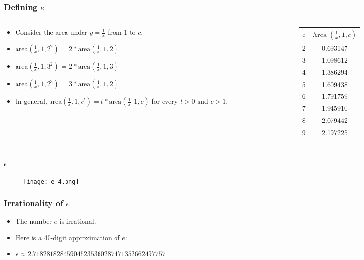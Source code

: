 \begin{frame}
  \frametitle{Defining \(e\)}
  \begin{columns}
    \begin{column}{0.5\textwidth}
      \begin{itemize}
        \item Consider the area under \(y = \frac{1}{x}\) from \(1\) to \(c\).
        \item area\((\frac{1}{x},1,2^{2})\) = \(2*\text{area}(\frac{1}{x},1,2)\)
        \item area\((\frac{1}{x},1,3^{2})\) = \(2*\text{area}(\frac{1}{x},1,3)\)                 
        \item area\((\frac{1}{x},1,2^{3})\) = \(3*\text{area}(\frac{1}{x},1,2)\)
        \item In general, area\((\frac{1}{x},1,c^{t}) = t*\text{area}(\frac{1}{x},1,c)\) for every \(t>0\) and \(c>1\).
      \end{itemize}
    \end{column}
    \begin{column}{0.5\textwidth}
      \begin{tabular}{|c|c|}
        \hline
        \( c \) & \( \text{Area }( \frac{1}{x},1, c )\) \\
        \hline
        2 & 0.693147 \\
        3 & 1.098612 \\
        4 & 1.386294 \\
        5 & 1.609438 \\
        6 & 1.791759 \\
        7 & 1.945910 \\
        8 & 2.079442 \\
        9 & 2.197225 \\
        \hline
      \end{tabular}
    \end{column}
  \end{columns}
\end{frame}


\begin{frame}
  \frametitle{\(e \) }
  \begin{figure}
    \texttt{[image: e\_4.png]}
  \end{figure}
\end{frame}

\begin{frame}
  \frametitle{Irrationality of \(e\)}
  \begin{itemize}
    \item The number \(e\) is irrational.
    \item Here is a 40-digit approximation of \(e\):
    \item \(e \approx 2.718281828459045235360287471352662497757\)
  \end{itemize}
\end{frame}

